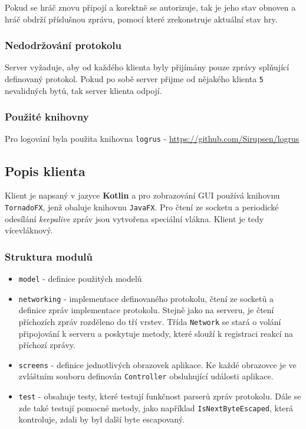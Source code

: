 \documentclass[12pt, a4paper]{article}
\begin{document}
	Pokud se hráč znovu připojí a korektně se autorizuje, tak je jeho stav obnoven a hráč obdrží příslušnou zprávu, pomocí které zrekonstruje aktuální stav hry.
			
			\subsubsection{Nedodržování protokolu}
			Server vyžaduje, aby od každého klienta byly přijímány pouze zprávy splňující definovaný protokol. Pokud po sobě server přijme od nějakého klienta \texttt{5} nevalidných bytů, tak server klienta odpojí.
			\subsubsection{Použité knihovny}
			Pro logování byla použita knihovna \texttt{logrus} - \href{https://github.com/Sirupsen/logrus}{https://github.com/Sirupsen/logrus}
	    \subsection{Popis klienta}
	    Klient je napsaný v jazyce \textbf{Kotlin} a pro zobrazování GUI používá knihovnu \texttt{TornadoFX}, jenž obaluje knihovnu \texttt{JavaFX}.
	    Pro čtení ze socketu a periodické odesílání \textit{keepalive} zpráv jsou vytvořena speciální vlákna. Klient je tedy vícevláknový.
   		    \subsubsection{Struktura modulů}
   			\begin{itemize}

	    	\item \texttt{model} - definice použitých modelů
	    	\item \texttt{networking} - implementace definovaného protokolu, čtení ze socketů a definice zpráv implementace protokolu. Stejně jako na serveru, je čtení příchozích zpráv rozděleno do tří vrstev. Třída \texttt{Network} se stará o volání připojování k serveru a poskytuje metody, které slouží k registraci reakcí na příchozí zprávy.
 	    	\item \texttt{screens} - definice jednotlivých obrazovek aplikace. Ke každé obrazovce je ve zvláštním souboru definován \texttt{Controller} obsluhující události aplikace.
			\item \texttt{test} - obsahuje testy, které testují funkčnost parserů zpráv protokolu. Dále se zde také testují pomocné metody, jako například \texttt{IsNextByteEscaped}, která kontroluje, zdali by byl další byte escapovaný.
 	    	\end{itemize}
\end{document}
